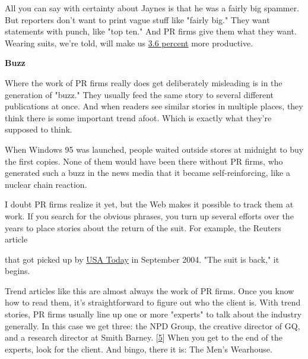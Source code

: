 All you can say with certainty about Jaynes is
                  that he was a fairly big spammer. But reporters don't want to
                  print vague stuff like "fairly big." They want statements with
                  punch, like "top ten." And PR firms give them what they want.
                  Wearing suits, we're told, will make us
                  \href{http://sanfrancisco.bizjournals.com/sanfrancisco/stories/2002/02/25/story5.html?t=printable}{3.6 percent}
                  more productive.

\textbf{Buzz}

Where the
                  work of PR firms really does get deliberately misleading is in
                  the generation of "buzz." They usually feed the same story to
                  several different publications at once. And when readers see
                  similar stories in multiple places, they think there is some
                  important trend afoot. Which is exactly what they're supposed
                  to think.

When Windows 95 was launched, people
                  waited outside stores at midnight to buy the first copies.
                  None of them would have been there without PR firms, who
                  generated such a buzz in the news media that it became
                  self-reinforcing, like a nuclear chain reaction.

I
                  doubt PR firms realize it yet, but the Web makes it possible
                  to track them at work. If you search for the obvious phrases,
                  you turn up several efforts over the years to place stories
                  about the return of the suit. For example, the Reuters article
                  
                  that got picked up by
                  \href{http://www.usatoday.com/money/industries/retail/2004-09-01-suits\_x.htm}{USA Today}
                  in September 2004. "The suit is back," it begins.

Trend
                  articles like this are almost always the work of PR firms.
                  Once you know how to read them, it's straightforward to figure
                  out who the client is. With trend stories, PR firms usually
                  line up one or more "experts" to talk about the industry
                  generally. In this case we get three: the NPD Group, the
                  creative director of GQ, and a research director at Smith
                  Barney.
                  [\href{\#f5n}{5}]
                  When you get to the end of the experts, look for the client.
                  And bingo, there it is: The Men's Wearhouse.

